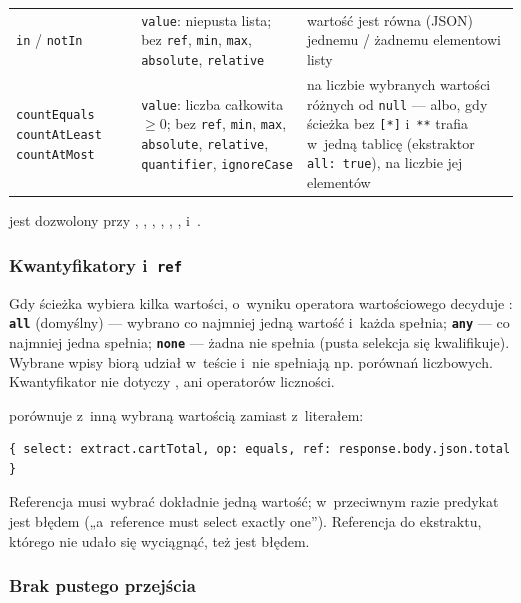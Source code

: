 {\begin{xltabular}{\linewidth}{@{}>{\raggedright\arraybackslash}p{2.9cm} >{\raggedright\arraybackslash}p{5.3cm} >{\raggedright\arraybackslash}X@{}}
\texttt{in} / \texttt{notIn} & \texttt{value}: niepusta lista; bez \texttt{ref}, \texttt{min},
\texttt{max}, \texttt{absolute}, \texttt{relative} & wartość jest równa (JSON) jednemu /
żadnemu elementowi listy \\
\texttt{countEquals} \texttt{countAtLeast} \texttt{countAtMost} & \texttt{value}: liczba
całkowita $\geq 0$; bez \texttt{ref}, \texttt{min}, \texttt{max}, \texttt{absolute},
\texttt{relative}, \texttt{quantifier}, \texttt{ignoreCase} & na liczbie wybranych wartości
różnych od \texttt{null} --- albo, gdy ścieżka bez \texttt{[*]} i~\texttt{**} trafia w~jedną
tablicę (ekstraktor \texttt{all: true}), na liczbie jej elementów \\
\end{xltabular}
}

 jest dozwolony przy , ,
, , , ,
 i~.

\subsubsection{Kwantyfikatory i~\texttt{ref}}

Gdy ścieżka wybiera kilka wartości, o~wyniku operatora wartościowego decyduje
: \textbf{\texttt{all}} (domyślny) --- wybrano co najmniej jedną wartość
i~każda spełnia; \textbf{\texttt{any}} --- co najmniej jedna spełnia; \textbf{\texttt{none}}
--- żadna nie spełnia (pusta selekcja się kwalifikuje). Wybrane wpisy  biorą
udział w~teście i~nie spełniają np. porównań liczbowych. Kwantyfikator nie dotyczy
,  ani operatorów liczności.

 porównuje z~inną wybraną wartością zamiast z~literałem:

\begin{lstlisting}
{ select: extract.cartTotal, op: equals, ref: response.body.json.total }
\end{lstlisting}

Referencja
musi wybrać dokładnie jedną wartość; w~przeciwnym razie predykat jest błędem („a~reference
must select exactly one”). Referencja do ekstraktu, którego nie udało się wyciągnąć, też jest
błędem.

\subsubsection{Brak pustego przejścia}

